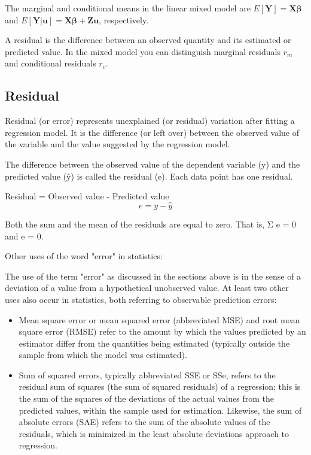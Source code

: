 \documentclass[Main.tex]{subfiles}
\begin{document}
The marginal and conditional means in the linear mixed model are
$E[\boldsymbol{Y}] = \boldsymbol{X}\boldsymbol{\beta}$ and
$E[\boldsymbol{Y|\boldsymbol{u}}] = \boldsymbol{X}\boldsymbol{\beta} + \boldsymbol{Z}\boldsymbol{u}$, respectively.

A residual is the difference between an observed quantity and its estimated or predicted value. In the mixed
model you can distinguish marginal residuals $r_m$ and conditional residuals $r_c$. 


\subsection{Residual}
Residual (or error) represents unexplained (or residual) variation after fitting a regression model. It is the difference (or left over) between the observed value of the variable and the value suggested by the regression model.



The difference between the observed value of the dependent variable (y) and the predicted value (ŷ) is called the residual (e). Each data point has one residual.

Residual = Observed value - Predicted value 
\[e = y - \hat{y} \]

Both the sum and the mean of the residuals are equal to zero. That is, Σ e = 0 and e = 0.







Other uses of the word "error" in statistics: 

The use of the term "error" as discussed in the sections above is in the sense of a deviation of a value from a hypothetical unobserved value. At least two other uses also occur in statistics, both referring to observable prediction errors:

\begin{itemize}
	\item Mean square error or mean squared error (abbreviated MSE) and root mean square error (RMSE) refer to the amount by which the values predicted by an estimator differ from the quantities being estimated (typically outside the sample from which the model was estimated).
	
	\item 
	Sum of squared errors, typically abbreviated SSE or SSe, refers to the residual sum of squares (the sum of squared residuals) of a regression; this is the sum of the squares of the deviations of the actual values from the predicted values, within the sample used for estimation. Likewise, the sum of absolute errors (SAE) refers to the sum of the absolute values of the residuals, which is minimized in the least absolute deviations approach to regression.
	
\end{itemize}
\end{document}
